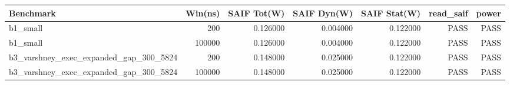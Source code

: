 \begin{tabular}{lrrrrrr}
\hline
Benchmark & Win(ns) & SAIF Tot(W) & SAIF Dyn(W) & SAIF Stat(W) & read\_saif & power \\
\hline
b1\_small & 200 & 0.126000 & 0.004000 & 0.122000 & PASS & PASS \\
b1\_small & 100000 & 0.126000 & 0.004000 & 0.122000 & PASS & PASS \\
b3\_varshney\_exec\_expanded\_gap\_300\_5824 & 200 & 0.148000 & 0.025000 & 0.122000 & PASS & PASS \\
b3\_varshney\_exec\_expanded\_gap\_300\_5824 & 100000 & 0.148000 & 0.025000 & 0.122000 & PASS & PASS \\
\hline
\end{tabular}
